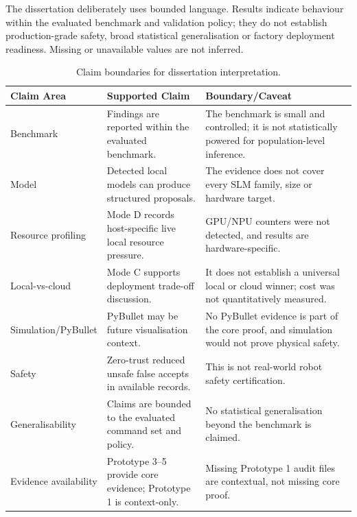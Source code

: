 \documentclass[sigconf,nonacm]{acmart}
\begin{document}
The dissertation deliberately uses bounded language. Results indicate behaviour within the evaluated benchmark and validation policy; they do not establish production-grade safety, broad statistical generalisation or factory deployment readiness. Missing or unavailable values are not inferred.

\begin{table}[t]
\centering
\caption{Claim boundaries for dissertation interpretation.}
\label{tab:claim_boundaries}
\footnotesize
\begin{tabularx}{\textwidth}{L{0.18\textwidth}Y Y}
\toprule
Claim Area & Supported Claim & Boundary/Caveat \\
\midrule
Benchmark & Findings are reported within the evaluated benchmark. & The benchmark is small and controlled; it is not statistically powered for population-level inference. \\

Model & Detected local models can produce structured proposals. & The evidence does not cover every SLM family, size or hardware target. \\

Resource profiling & Mode D records host-specific live local resource pressure. & GPU/NPU counters were not detected, and results are hardware-specific. \\

Local-vs-cloud & Mode C supports deployment trade-off discussion. & It does not establish a universal local or cloud winner; cost was not quantitatively measured. \\

Simulation/PyBullet & PyBullet may be future visualisation context. & No PyBullet evidence is part of the core proof, and simulation would not prove physical safety. \\

Safety & Zero-trust reduced unsafe false accepts in available records. & This is not real-world robot safety certification. \\

Generalisability & Claims are bounded to the evaluated command set and policy. & No statistical generalisation beyond the benchmark is claimed. \\

Evidence availability & Prototype 3--5 provide core evidence; Prototype 1 is context-only. & Missing Prototype 1 audit files are contextual, not missing core proof. \\
\bottomrule
\end{tabularx}
\end{table}
\end{document}

